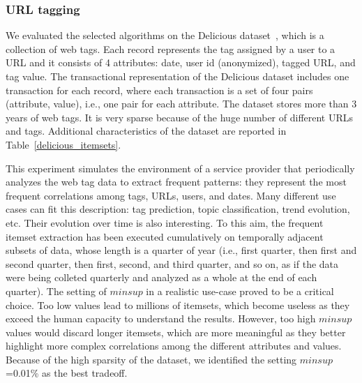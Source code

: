 \subsubsection{URL tagging}
\label{delicious_exp}

We evaluated the selected algorithms on the Delicious dataset~\cite{wetzker2008analyzing}, which is a
collection of web tags.
Each record represents the tag assigned by a user to a URL and it consists of
4 attributes:
date,
user id (anonymized),
tagged URL,
and tag value.
The transactional representation of the Delicious dataset includes
one transaction for each record, where each transaction is a set of four pairs
(attribute, value), i.e., one pair for each attribute.
The dataset stores more than 3 years of web tags.
It is very sparse because of the huge number of different URLs
and tags.
Additional characteristics of the dataset are reported
in Table~\ref{delicious_itemsets}.

This experiment simulates the environment of a service provider that
periodically analyzes the web tag data to extract frequent patterns: they
represent the most frequent correlations among tags, URLs, users, and dates.
Many different use cases can fit this description:
tag prediction, topic classification, trend evolution, etc.
Their evolution over time is also interesting.
To this aim, the frequent itemset extraction has been executed
cumulatively on temporally adjacent subsets of data,
whose length is a quarter of year (i.e., first quarter,
then first and second quarter, then first, second, and third quarter, and so on,
as if the data were being colleted quarterly and analyzed as a whole at the
end of each quarter).
The setting of $minsup$ in a realistic use-case proved to be a critical choice.
Too low values lead to millions of itemsets,
which become useless as they exceed the human capacity to understand the results.
However, too high $minsup$ values would discard longer itemsets,
which are more meaningful
as they better highlight more complex correlations
among the different attributes and values.
Because of the high sparsity of the dataset,
we identified the setting $minsup$=0.01\% as the best tradeoff.

